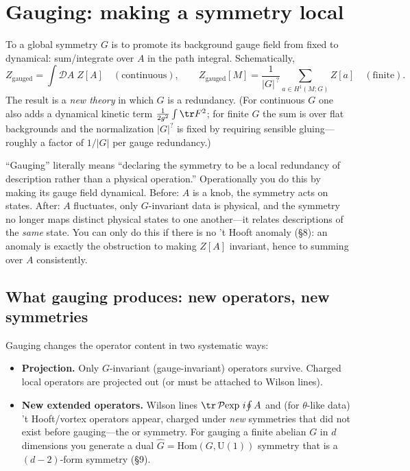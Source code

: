 \documentclass[11pt]{article}
\newcommand{\Pexp}{\mathcal{P}\!\exp}        %
\newcommand{\Uone}{\mathrm{U}(1)}
\begin{document}
\section{Gauging: making a symmetry local}

\begin{ddefinition}[Gauging]
To  a global symmetry $G$ is to promote its background gauge field from
fixed to dynamical: sum/integrate over $A$ in the path integral. Schematically,
\[
Z_{\text{gauged}} = \int \mathcal D A \; Z[A]
\quad(\text{continuous}),
\qquad
Z_{\text{gauged}}[M] = \frac{1}{|G|^{\,?}}\sum_{a\in H^1(M;G)} Z[a]
\quad(\text{finite}).
\]
The result is a \emph{new theory} in which $G$ is a redundancy. (For continuous $G$ one
also adds a dynamical kinetic term $\frac1{2g^2}\int\tr F^2$; for finite $G$ the sum is
over flat backgrounds and the normalization $|G|^{?}$ is fixed by requiring sensible
gluing---roughly a factor of $1/|G|$ per gauge redundancy.)
\end{ddefinition}

\begin{iintuition}
``Gauging'' literally means ``declaring the symmetry to be a local redundancy of
description rather than a physical operation.'' Operationally you do this by making its
gauge field dynamical. Before: $A$ is a knob, the symmetry acts on states. After: $A$
fluctuates, only $G$-invariant data is physical, and the symmetry no longer maps
distinct physical states to one another---it relates descriptions of the \emph{same}
state. You can only do this if there is no 't Hooft anomaly (\S8): an anomaly is exactly
the obstruction to making $Z[A]$ invariant, hence to summing over $A$ consistently.
\end{iintuition}

\subsection{What gauging produces: new operators, new symmetries}

Gauging changes the operator content in two systematic ways:
\begin{itemize}
\item \textbf{Projection.} Only $G$-invariant (gauge-invariant) operators survive.
Charged local operators are projected out (or must be attached to Wilson lines).
\item \textbf{New extended operators.} Wilson lines $\tr\,\Pexp\,i\!\oint A$ and (for
$\theta$-like data) 't Hooft/vortex operators appear, charged under \emph{new} symmetries
that did not exist before gauging---the  or  symmetry. For
gauging a finite abelian $G$ in $d$ dimensions you generate a dual
$\widehat G=\mathrm{Hom}(G,\Uone)$ symmetry that is a $(d-2)$-form symmetry (\S9).
\end{itemize}
\end{document}
